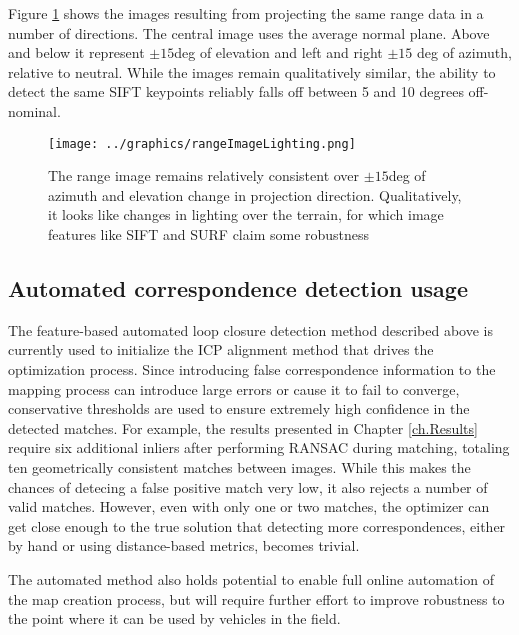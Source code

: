 Figure \ref{fig:lighting} shows the images resulting from projecting the same range data in a number of directions. The central image uses the average normal plane. Above and below it represent $\pm 15$deg of elevation and left and right $\pm 15$ deg of azimuth, relative to neutral. While the images remain qualitatively similar, the ability to detect the same SIFT keypoints reliably falls off between 5 and 10 degrees off-nominal.

\begin{figure}[htb]
   \centering
   \texttt{[image: ../graphics/rangeImageLighting.png]} %
   \caption{The range image remains relatively consistent over $\pm 15$deg of azimuth and elevation change in projection direction. Qualitatively, it looks like changes in lighting over the terrain, for which image features like SIFT and SURF claim some robustness \cite{Lowe2004} }
   \label{fig:lighting}
\end{figure}

\subsection{Automated correspondence detection usage}

The feature-based automated loop closure detection method described above is currently used to initialize the ICP alignment method that drives the optimization process. Since introducing false correspondence information to the mapping process can introduce large errors or cause it to fail to converge, conservative thresholds are used to ensure extremely high confidence in the detected matches. For example, the results presented in Chapter \ref{ch.Results} require six additional inliers after performing RANSAC during matching, totaling ten geometrically consistent matches between images. While this makes the chances of detecing a false positive match very low, it also rejects a number of valid matches. However, even with only one or two matches, the optimizer can get close enough to the true solution that detecting more correspondences, either by hand or using distance-based metrics, becomes trivial.

The automated method also holds potential to enable full online automation of the map creation process, but will require further effort to improve robustness to the point where it can be used by vehicles in the field. 



